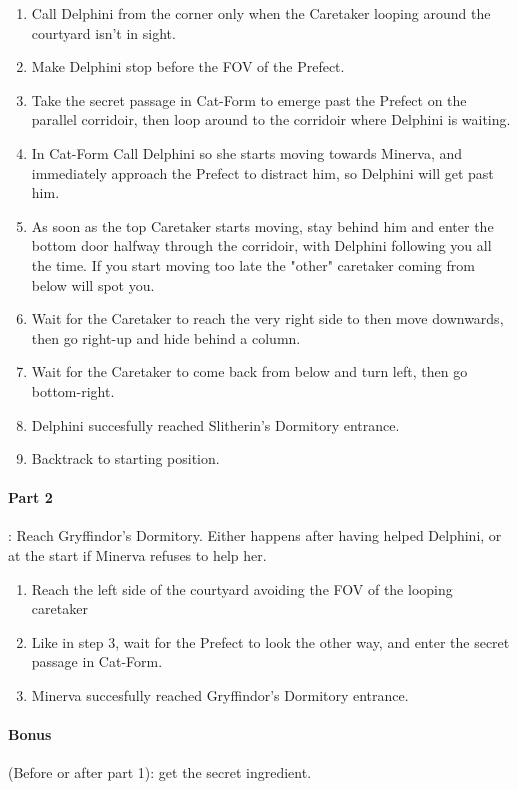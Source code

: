 \begin{enumerate}
\item Call Delphini from the corner only when the Caretaker looping around the courtyard isn't in sight.
	\item Make Delphini stop before the FOV of the Prefect.
	\item Take the secret passage in Cat-Form to emerge past the Prefect on the parallel corridoir, then loop around to the corridoir where Delphini is waiting.
	\item In Cat-Form Call Delphini so she starts moving towards Minerva, and immediately approach the Prefect to distract him, so Delphini will get past him.
	\item As soon as the top Caretaker starts moving, stay behind him and enter the bottom door halfway through the corridoir, with Delphini following you all the time. If you start moving too late the "other" caretaker coming from below will spot you.
	\item Wait for the Caretaker to reach the very right side to then move downwards, then go right-up and hide behind a column.
	\item Wait for the Caretaker to come back from below and turn left, then go bottom-right.
	\item Delphini succesfully reached Slitherin's Dormitory entrance.
	\item Backtrack to starting position.
\end{enumerate}

\paragraph{Part 2}: Reach Gryffindor's Dormitory. Either happens after having helped Delphini, or at the start if Minerva refuses to help her.

\begin{enumerate}[label={\arabic*.}, resume]
	\item Reach the left side of the courtyard avoiding the FOV of the looping caretaker
	\item Like in step 3, wait for the Prefect to look the other way, and enter the secret passage in Cat-Form.
	\item Minerva succesfully reached Gryffindor's Dormitory entrance.
\end{enumerate}

\paragraph{Bonus} (Before or after part 1): get the secret ingredient.

